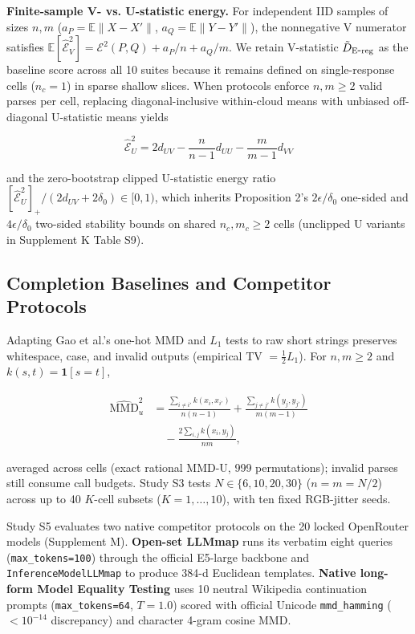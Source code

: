 \textbf{Finite-sample V- vs. U-statistic energy.} For independent IID samples of sizes $n,m$ ($a_P=\mathbb E\|X-X'\|$, $a_Q=\mathbb E\|Y-Y'\|$), the nonnegative V numerator satisfies $\mathbb E[\widehat{\mathcal E}_V^2]=\mathcal E^2(P,Q)+a_P/n+a_Q/m$. We retain V-statistic $\tilde D_{\mathrm{E\mbox{-}reg}}{}$ as the baseline score across all 10 suites because it remains defined on single-response cells ($n_c=1$) in sparse shallow slices. When protocols enforce $n,m\ge2$ valid parses per cell, replacing diagonal-inclusive within-cloud means with unbiased off-diagonal U-statistic means yields


\begin{equation*}
\widehat{\mathcal E}_U^2=2d_{UV}-\frac{n}{n-1}d_{UU}-\frac{m}{m-1}d_{VV}
\end{equation*}

\noindent and the zero-bootstrap clipped U-statistic energy ratio $[\widehat{\mathcal E}_U^2]_+/(2d_{UV}+2\delta_0)\in[0,1)$, which inherits Proposition 2's $2\epsilon/\delta_0$ one-sided and $4\epsilon/\delta_0$ two-sided stability bounds on shared $n_c,m_c\ge 2$ cells (unclipped U variants in Supplement K Table S9).


\subsection{Completion Baselines and Competitor Protocols}

Adapting Gao et al.'s one-hot MMD and $L_1$ tests \cite{ref4} to raw short strings preserves whitespace, case, and invalid outputs (empirical TV $= \tfrac12 L_1$). For $n,m\ge2$ and $k(s,t)=\mathbf1[s=t]$,


\begin{equation*}
\begin{aligned}\widehat{\mathrm{MMD}}_u^2&=\frac{\sum_{i\ne i'}k(x_i,x_{i'})}{n(n-1)}+\frac{\sum_{j\ne j'}k(y_j,y_{j'})}{m(m-1)}\\
&\quad-\frac{2\sum_{i,j}k(x_i,y_j)}{nm},\end{aligned}
\end{equation*}

\noindent averaged across cells (exact rational MMD-U, 999 permutations); invalid parses still consume call budgets. Study S3 tests $N\in\{6,10,20,30\}$ ($n=m=N/2$) across up to 40 $K$-cell subsets ($K=1,\ldots,10$), with ten fixed RGB-jitter seeds.


Study S5 evaluates two native competitor protocols on the 20 locked OpenRouter models (Supplement M). \textbf{Open-set LLMmap} \cite{ref16} runs its verbatim eight queries (\texttt{max\_\allowbreak{}tokens=\allowbreak{}100}) through the official E5-large backbone and \texttt{InferenceModelLLMmap} to produce 384-d Euclidean templates. \textbf{Native long-form Model Equality Testing} \cite{ref4} uses 10 neutral Wikipedia continuation prompts (\texttt{max\_\allowbreak{}tokens=\allowbreak{}64}, $T=1.0$) scored with official Unicode \texttt{mmd\_\allowbreak{}hamming} ($<10^{-14}$ discrepancy) and character 4-gram cosine MMD.


